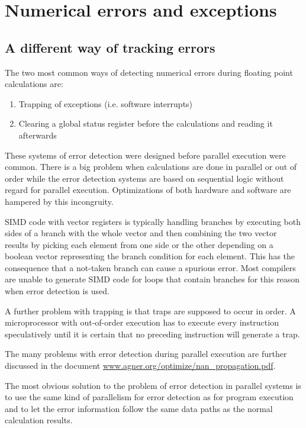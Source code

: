 \documentclass[forwardcom.tex]{subfiles}
\begin{document}
\RaggedRight


\chapter{Numerical errors and exceptions}

\section{A different way of tracking errors}
\label{ADifferentWayOfTrackingErrors}
The two most common ways of detecting numerical errors during floating point calculations are:
\begin{enumerate}
  \item Trapping of exceptions (i.e. software interrupts)
  \item Clearing a global status register before the calculations and reading it afterwards
\end{enumerate}

These systems of error detection were designed before parallel execution were common. There is a big problem when calculations are done in parallel or out of order while the error detection systems are based on sequential logic without regard for parallel execution. Optimizations of both hardware and software are hampered by this incongruity.
\vv

SIMD code with vector registers is typically handling branches by executing both sides of a branch with the whole vector and then combining the two vector results by picking each element from one side or the other depending on a boolean vector representing the branch condition for each element. This has the consequence that a not-taken branch can cause a spurious error. Most compilers are unable to generate SIMD code for loops that contain branches for this reason when error detection is used.
\vv

A further problem with trapping is that traps are supposed to occur in order. A microprocessor with out-of-order execution has to execute every instruction speculatively until it is certain that no preceding instruction will generate a trap.
\vv

The many problems with error detection during parallel execution are further discussed in the document 
\href{https://www.agner.org/optimize/nan_propagation.pdf}{www.agner.org/optimize/nan\_propagation.pdf}.
\vv

The most obvious solution to the problem of error detection in parallel systems is to use the same kind of parallelism for error detection as for program execution and to let the error information follow the same data paths as the normal calculation results.
\vv
\end{document}
